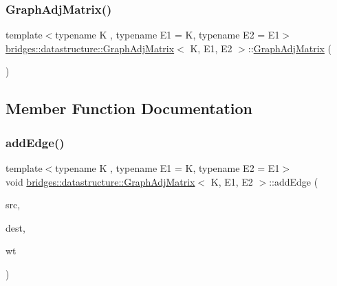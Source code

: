 \subsubsection{\texorpdfstring{Graph\+Adj\+Matrix()}{GraphAdjMatrix()}\hspace{0.1cm}{\footnotesize\ttfamily [2/2]}}
{\footnotesize\ttfamily template$<$typename K , typename E1  = K, typename E2  = E1$>$ \\
\hyperlink{classbridges_1_1datastructure_1_1_graph_adj_matrix}{bridges\+::datastructure\+::\+Graph\+Adj\+Matrix}$<$ K, E1, E2 $>$\+::\hyperlink{classbridges_1_1datastructure_1_1_graph_adj_matrix}{Graph\+Adj\+Matrix} (\begin{DoxyParamCaption}\item[{const \hyperlink{classbridges_1_1datastructure_1_1_graph_adj_matrix}{Graph\+Adj\+Matrix}$<$ K, E1, E2 $>$ \&}]{ }\end{DoxyParamCaption})\hspace{0.3cm}{\ttfamily [delete]}}



\subsection{Member Function Documentation}
\mbox{\label{classbridges_1_1datastructure_1_1_graph_adj_matrix_ab23870ac203b3784157ecb05443494a4}} 
\subsubsection{\texorpdfstring{add\+Edge()}{addEdge()}}
{\footnotesize\ttfamily template$<$typename K , typename E1  = K, typename E2  = E1$>$ \\
void \hyperlink{classbridges_1_1datastructure_1_1_graph_adj_matrix}{bridges\+::datastructure\+::\+Graph\+Adj\+Matrix}$<$ K, E1, E2 $>$\+::add\+Edge (\begin{DoxyParamCaption}\item[{const K \&}]{src,  }\item[{const K \&}]{dest,  }\item[{const unsigned int \&}]{wt }\end{DoxyParamCaption})\hspace{0.3cm}{\ttfamily [inline]}}

